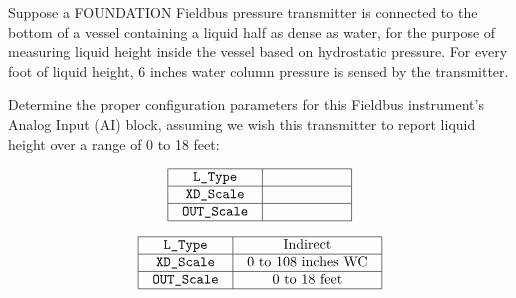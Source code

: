 

Suppose a FOUNDATION Fieldbus pressure transmitter is connected to the bottom of a vessel containing a liquid half as dense as water, for the purpose of measuring liquid height inside the vessel based on hydrostatic pressure.  For every foot of liquid height, 6 inches water column pressure is sensed by the transmitter.

\vskip 10pt

Determine the proper configuration parameters for this Fieldbus instrument's Analog Input (AI) block, assuming we wish this transmitter to report liquid height over a range of 0 to 18 feet:


$$\vbox{\offinterlineskip
\halign{\strut
\vrule \quad\hfil # \ \hfil & 
\vrule \quad\hfil # \ \hfil \vrule \cr
\noalign{\hrule}
%
{\tt L\_Type} & \hskip 50pt \cr
%
\noalign{\hrule}
%
{\tt XD\_Scale} & \hskip 50pt \cr
%
\noalign{\hrule}
%
{\tt OUT\_Scale} & \hskip 50pt \cr
%
\noalign{\hrule}
} %
}$$ %








$$\vbox{\offinterlineskip
\halign{\strut
\vrule \quad\hfil # \ \hfil & 
\vrule \quad\hfil # \ \hfil \vrule \cr
\noalign{\hrule}
%
{\tt L\_Type} & Indirect \cr
%
\noalign{\hrule}
%
{\tt XD\_Scale} & 0 to 108 inches WC \cr
%
\noalign{\hrule}
%
{\tt OUT\_Scale} & 0 to 18 feet \cr
%
\noalign{\hrule}
} %
}$$ %












